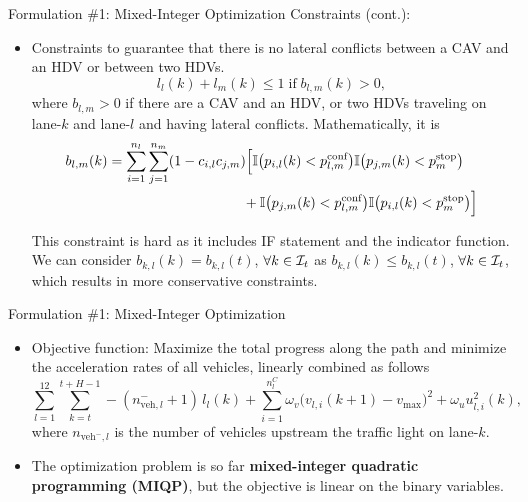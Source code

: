 \documentclass[9pt]{beamer}
\begin{document}
\begin{frame}{Formulation \#1: Mixed-Integer Optimization}
Constraints (cont.):

\begin{itemize}
\item Constraints to guarantee that there is no lateral conflicts between a CAV and an HDV or between two HDVs.
\begin{equation*}
l_l(k) + l_m(k) \le 1 \;\text{if}\; b_{l,m} (k) > 0,
\end{equation*}
where $b_{l,m} > 0$ if there are a CAV and an HDV, or two HDVs traveling on lane-$k$ and lane-$l$ and having lateral conflicts.
Mathematically, it is
\begin{equation*}
\begin{multlined}
b_{l,m}(k) = \sum_{i=1}^{n_l} \sum_{j=1}^{n_m} (1 - c_{i,l} c_{j,m}) 
\Big[ 
\II \big( p_{i,l}(k) < p_{l,m}^{\text{conf}} \big) \II \big( p_{j,m}(k) < p_{m}^{\text{stop}} \big) \\
+ \II \big( p_{j,m}(k) < p_{l,m}^{\text{conf}} \big) \II \big( p_{i,l}(k) < p_{m}^{\text{stop}} \big)
\Big] 
\end{multlined}
\end{equation*}

This constraint is hard as it includes IF statement and the indicator function.
We can consider $b_{k,l} (k) = b_{k,l} (t)$, $\forall k \in \mathcal{I}_t$ as $b_{k,l} (k) \le b_{k,l} (t)$, $\forall k \in \mathcal{I}_t$, which results in more conservative constraints.
\end{itemize}
\end{frame}


\begin{frame}{Formulation \#1: Mixed-Integer Optimization}
\begin{itemize}
\item Objective function: Maximize the total progress along the path and minimize the acceleration rates of all vehicles, linearly combined as follows
\begin{equation*}
\sum_{l=1}^{12}  \sum_{k = t}^{t+H-1} - (n_{\text{veh},l}^{-}+1) \, l_l(k) + \sum_{i=1}^{n^C_l} \omega_v \big( v_{l,i} (k+1) - v_{\max} \big)^2 + \omega_u u^2_{l,i} (k),
\end{equation*}
where $n_{\text{veh}^{-},l}$ is the number of vehicles upstream the traffic light on lane-$k$.

\item The optimization problem is so far \textbf{mixed-integer quadratic programming (MIQP)}, but the objective is linear on the binary variables.

\end{itemize}




\end{frame}
\end{document}
